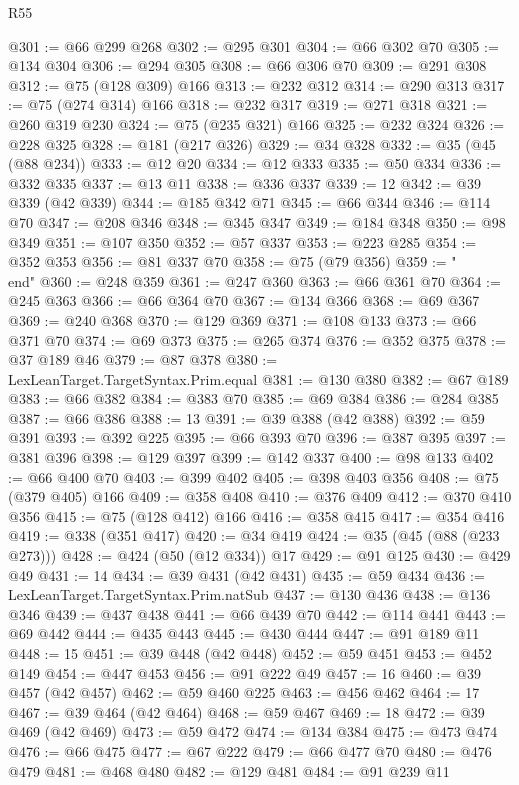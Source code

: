 \begin{lexlean}{R55}
\begin{coremodule}
{{{{{{{{{{{{{{{{{{{{{{{{{{{{{{{{{{{{{{{{{{{{{{{{{{{{{{{{{{{{{{{{{{{{{{{{{{{{{{{{@301 := @66 @299 @268
@302 := @295 @301
@304 := @66 @302 @70
@305 := @134 @304
@306 := @294 @305
@308 := @66 @306 @70
@309 := @291 @308
@312 := @75 (@128 @309) @166
@313 := @232 @312
@314 := @290 @313
@317 := @75 (@274 @314) @166
@318 := @232 @317
@319 := @271 @318
@321 := @260 @319 @230
@324 := @75 (@235 @321) @166
@325 := @232 @324
@326 := @228 @325
@328 := @181 (@217 @326)
@329 := @34 @328
@332 := @35 (@45 (@88 @234))
@333 := @12 @20
@334 := @12 @333
@335 := @50 @334
@336 := @332 @335
@337 := @13 @11
@338 := @336 @337
@339 := 12
@342 := @39 @339 (@42 @339)
@344 := @185 @342 @71
@345 := @66 @344
@346 := @114 @70
@347 := @208 @346
@348 := @345 @347
@349 := @184 @348
@350 := @98 @349
@351 := @107 @350
@352 := @57 @337
@353 := @223 @285
@354 := @352 @353
@356 := @81 @337 @70
@358 := @75 (@79 @356)
@359 := "\\end"
@360 := @248 @359
@361 := @247 @360
@363 := @66 @361 @70
@364 := @245 @363
@366 := @66 @364 @70
@367 := @134 @366
@368 := @69 @367
@369 := @240 @368
@370 := @129 @369
@371 := @108 @133
@373 := @66 @371 @70
@374 := @69 @373
@375 := @265 @374
@376 := @352 @375
@378 := @37 @189 @46
@379 := @87 @378
@380 := LexLeanTarget.TargetSyntax.Prim.equal
@381 := @130 @380
@382 := @67 @189
@383 := @66 @382
@384 := @383 @70
@385 := @69 @384
@386 := @284 @385
@387 := @66 @386
@388 := 13
@391 := @39 @388 (@42 @388)
@392 := @59 @391
@393 := @392 @225
@395 := @66 @393 @70
@396 := @387 @395
@397 := @381 @396
@398 := @129 @397
@399 := @142 @337
@400 := @98 @133
@402 := @66 @400 @70
@403 := @399 @402
@405 := @398 @403 @356
@408 := @75 (@379 @405) @166
@409 := @358 @408
@410 := @376 @409
@412 := @370 @410 @356
@415 := @75 (@128 @412) @166
@416 := @358 @415
@417 := @354 @416
@419 := @338 (@351 @417)
@420 := @34 @419
@424 := @35 (@45 (@88 (@233 @273)))
@428 := @424 (@50 (@12 @334)) @17
@429 := @91 @125
@430 := @429 @49
@431 := 14
@434 := @39 @431 (@42 @431)
@435 := @59 @434
@436 := LexLeanTarget.TargetSyntax.Prim.natSub
@437 := @130 @436
@438 := @136 @346
@439 := @437 @438
@441 := @66 @439 @70
@442 := @114 @441
@443 := @69 @442
@444 := @435 @443
@445 := @430 @444
@447 := @91 @189 @11
@448 := 15
@451 := @39 @448 (@42 @448)
@452 := @59 @451
@453 := @452 @149
@454 := @447 @453
@456 := @91 @222 @49
@457 := 16
@460 := @39 @457 (@42 @457)
@462 := @59 @460 @225
@463 := @456 @462
@464 := 17
@467 := @39 @464 (@42 @464)
@468 := @59 @467
@469 := 18
@472 := @39 @469 (@42 @469)
@473 := @59 @472
@474 := @134 @384
@475 := @473 @474
@476 := @66 @475
@477 := @67 @222
@479 := @66 @477 @70
@480 := @476 @479
@481 := @468 @480
@482 := @129 @481
@484 := @91 @239 @11
}}}}}}}}}}}}}}}}}}}}}}}}}}}}}}}}}}}}}}}}}}}}}}}}}}}}}}}}}}}}}}}}}}}}}}}}}}}}}}}}
\end{coremodule}
\end{lexlean}
